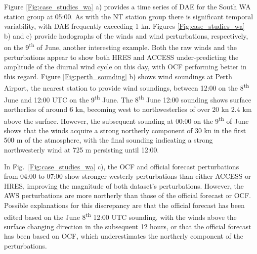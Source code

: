 \documentclass[twocol]{ametsoc}
\begin{document}
Figure \ref{Fig:case_studies_wa} a) provides a time series of DAE for the South WA station group at 05:00. As with the NT station group there is significant temporal variability, with DAE frequently exceeding 1 kn. Figures \ref{Fig:case_studies_wa} b) and c) provide hodographs of the winds and wind perturbations, respectively, on the 9\textsuperscript{th} of June, another interesting example. Both the raw winds and the perturbations appear to show both HRES and ACCESS under-predicting the amplitude of the diurnal wind cycle on this day, with OCF performing better in this regard. Figure \ref{Fig:perth_sounding} b) shows wind soundings at Perth Airport, the nearest station to provide wind soundings, between 12:00 on the 8\textsuperscript{th} June and 12:00 UTC on the 9\textsuperscript{th} June. The 8\textsuperscript{th} June 12:00 sounding shows surface northerlies of around $6$ kn, becoming west to northwesterlies of over 20 kn $2.4$ km above the surface. However, the subsequent sounding at 00:00 on the 9\textsuperscript{th} of June shows that the winds acquire a strong northerly component of 30 kn in the first 500 m of the atmosphere, with the final sounding indicating a strong northwesterly wind at 725 m persisting until 12:00. 

In Fig.~\ref{Fig:case_studies_wa} c), the OCF and official forecast perturbations from 04:00 to 07:00 show stronger westerly perturbations than either ACCESS or HRES, improving the magnitude of both dataset's perturbations. However, the AWS perturbations are more northerly than those of the official forecast or OCF. Possible explanations for this discrepancy are that the official forecast has been edited based on the June 8\textsuperscript{th} 12:00 UTC sounding, with the winds above the surface changing direction in the subsequent 12 hours, or that the official forecast has been based on OCF, which underestimates the northerly component of the perturbations.
\end{document}
